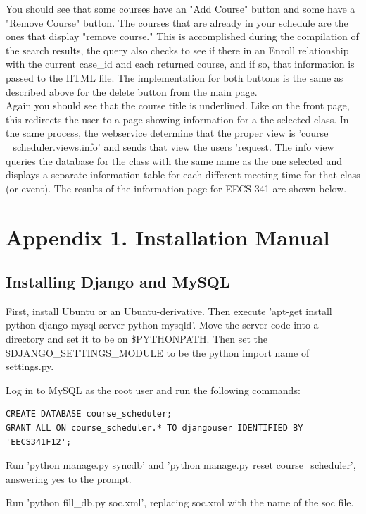 \documentclass[pdftex,12pt,letter]{article}
\begin{document}
\FloatBarrier
You should see that some courses have an "Add Course" button and some have a "Remove Course" button. The courses that are already in your schedule are the ones that display "remove course." This is accomplished during the compilation of the search results, the query also checks to see if there in an Enroll relationship with the current case\_id and each returned course, and if so, that information is passed to the HTML file. The implementation for both buttons is the same as described above for the delete button from the main page.\\

Again you should see that the course title is underlined. Like on the front page, this redirects the user to a page showing information for a the selected class. In the same process, the webservice determine that the proper view is 'course \_scheduler.views.info' and sends that view the users 'request. The info view queries the database for the class with the same name as the one selected and displays a separate information table for each different meeting time for that class (or event). The results of the information page for EECS 341 are shown below.

\appendix
\section{Appendix 1. Installation Manual}
\subsection{Installing Django and MySQL}
First, install Ubuntu or an Ubuntu-derivative.  Then execute 'apt-get install python-django mysql-server python-mysqld'.  Move the server code into a directory and set it to be on \$PYTHONPATH.  Then set the \$DJANGO\_SETTINGS\_MODULE to be the python import name of settings.py.

Log in to MySQL as the root user and run the following commands:

\begin{verbatim}
CREATE DATABASE course_scheduler;
GRANT ALL ON course_scheduler.* TO djangouser IDENTIFIED BY 'EECS341F12';
\end{verbatim}

Run 'python manage.py syncdb' and 'python manage.py reset course\_scheduler', answering yes to the prompt.

Run 'python fill\_db.py soc.xml', replacing soc.xml with the name of the soc file.
\end{document}
